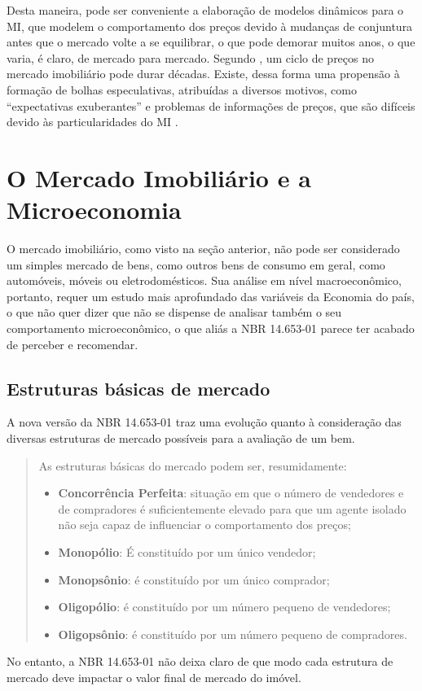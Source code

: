 \documentclass[
	12pt,				%
	oneside,			%
	a4paper,			%
	chapter=TITLE,		%
	section=TITLE,		%
	english,			%
	brazil				%
	]{abntex2}
\begin{document}
Desta maneira, pode ser conveniente a elaboração de modelos dinâmicos para o
\gls{MI}, que modelem o comportamento dos preços devido à mudanças de conjuntura
antes que o mercado volte a se equilibrar, o que pode demorar muitos anos, o que
varia, é claro, de mercado para mercado. Segundo \textcite[p.~4]{regulation}, um ciclo de
preços no mercado imobiliário pode durar décadas. Existe, dessa forma uma
propensão à formação de bolhas especulativas, atribuídas a diversos motivos,
como ``expectativas exuberantes'' e problemas de informações de preços, que são
difíceis devido às particularidades do \gls{MI} \autocite[3]{ADAMS2010}.

\hypertarget{micro}{%
\section{O Mercado Imobiliário e a Microeconomia}\label{micro}}

O mercado imobiliário, como visto na seção anterior, não pode ser
considerado um simples mercado de bens, como outros bens de consumo em geral,
como automóveis, móveis ou eletrodomésticos. Sua análise em nível macroeconômico,
portanto, requer um estudo mais aprofundado das variáveis da Economia do país,
o que não quer dizer que não se dispense de analisar também o seu comportamento
microeconômico, o que aliás a NBR 14.653-01 \autocite*{NBR1465301} parece ter acabado de
perceber e recomendar.

\hypertarget{estruturas-buxe1sicas-de-mercado}{%
\subsection{Estruturas básicas de mercado}\label{estruturas-buxe1sicas-de-mercado}}

A nova versão da NBR 14.653-01 \autocite*[ix]{NBR1465301} traz uma evolução quanto à
consideração das diversas estruturas de mercado possíveis para a avaliação de um
bem.
\begin{quote}
As estruturas básicas do mercado podem ser, resumidamente:
\begin{itemize}
\item
  \textbf{Concorrência Perfeita}: situação em que o número de vendedores e de
  compradores é suficientemente elevado para que um agente isolado não seja
  capaz de influenciar o comportamento dos preços;
\item
  \textbf{Monopólio}: É constituído por um único vendedor;
\item
  \textbf{Monopsônio}: é constituído por um único comprador;
\item
  \textbf{Oligopólio}: é constituído por um número pequeno de vendedores;
\item
  \textbf{Oligopsônio}: é constituído por um número pequeno de compradores.
\end{itemize}
\end{quote}
No entanto, a NBR 14.653-01 \autocite*{NBR1465301} não deixa claro de que modo cada
estrutura de mercado deve impactar o valor final de mercado do imóvel.
\end{document}
